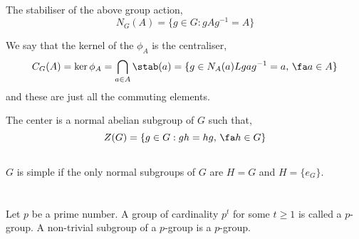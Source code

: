\documentclass{article}
\begin{document}
\subsection[Normalisers, Centralisers and Centers]{}

\begin{ndefi}[Normaliser]
  The stabiliser of the above group action,
  $$ N_G(A) = \{g \in G : gAg^{-1} = A\} $$
\end{ndefi}

\begin{ndefi}[Centraliser]
  We say that the kernel of the $\phi_A$ is the centraliser,
  $$C_G(A) = \ker \phi_A = \bigcap_{a \in A}\stab(a) = \{g \in N_A(a) L gag^{-1} = a,\,\fa a \in A\} $$
  and these are just all the commuting elements.
\end{ndefi}

\begin{ndefi}[Center of $G$]
  The center is a normal abelian subgroup of $G$ such that,
  $$ Z(G) = \{g \in G : gh = hg,\, \fa h \in G\} $$
\end{ndefi}

\subsection[The Class Equation]{}

\subsubsection[Conjuagacy Classes of $S_n$]{}

\subsection[Simple Groups]{}

\begin{ndefi}
  $G$ is simple if the only normal subgroups of $G$ are $H = G$ and $H = \{e_G\}$.
\end{ndefi}

\section[Sylow's Theorems]{}

\begin{ndefi}[$p$-group]
  Let $p$ be a prime number. A group of cardinality $p^t$ for some $t \ge 1$ is called a $p$-group. A non-trivial subgroup of a $p$-group is a $p$-group.
\end{ndefi}
\end{document}
